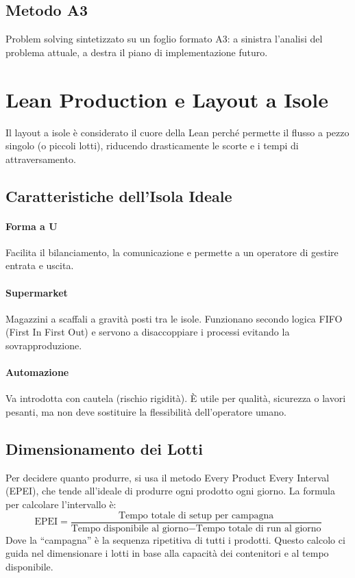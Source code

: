 %
\subsection{Metodo A3}
Problem solving sintetizzato su un foglio formato A3: a sinistra l'analisi del problema attuale, a destra il piano di implementazione futuro.

%
\section{Lean Production e Layout a Isole}
Il layout a isole è considerato il cuore della Lean perché permette il flusso a pezzo singolo (o piccoli lotti), riducendo drasticamente le scorte e i tempi di attraversamento.
%
\subsection{Caratteristiche dell'Isola Ideale}
%
\paragraph{Forma a U} Facilita il bilanciamento, la comunicazione e permette a un operatore di gestire entrata e uscita.
%
\paragraph{Supermarket} Magazzini a scaffali a gravità posti tra le isole. Funzionano secondo logica FIFO (First In First Out) e servono a disaccoppiare i processi evitando la sovrapproduzione.
%
\paragraph{Automazione} Va introdotta con cautela (rischio rigidità). È utile per qualità, sicurezza o lavori pesanti, ma non deve sostituire la flessibilità dell'operatore umano.

%
\subsection{Dimensionamento dei Lotti}
Per decidere quanto produrre, si usa il metodo Every Product Every Interval (EPEI), che tende all'ideale di produrre ogni prodotto ogni giorno. La formula per calcolare l'intervallo è:
\[
    \text{EPEI} = \frac{\text{Tempo totale di setup per campagna}}{\text{Tempo disponibile al giorno}-\text{Tempo totale di run al giorno}}
\]
Dove la ``campagna'' è la sequenza ripetitiva di tutti i prodotti. Questo calcolo ci guida nel dimensionare i lotti in base alla capacità dei contenitori e al tempo disponibile.

